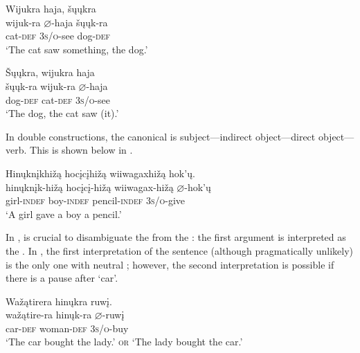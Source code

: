 \documentclass[output=paper]{LSP/langsci}
\begin{document}
\begin{exe}
\ex\label{ex:rosen:4}
\begin{xlist}

\ex \glll Wijukra  haja, šųųkra \\
 wijuk-ra {$\varnothing$}-haja  šųųk-ra\\
cat-\textsc{def}  \textsc{3s/o}-see dog-\textsc{def}\\
\glt `The cat saw something, the dog.' 

\ex \glll \v{S}ųųkra, wijukra haja  \\
 šųųk-ra wijuk-ra {$\varnothing$}-haja  \\
dog-\textsc{def} cat-\textsc{def}  \textsc{3s/o}-see \\
\glt `The dog, the cat saw (it).' 

\end{xlist}
\end{exe}

In double  constructions, the canonical  is subject---indirect object---direct object---verb. This is shown below in .

\begin{exe}

\ex \label{ex:rosen:5}\glll Hinųknįkhižą hocįcįhižą wiiwagaxhižą hok'ų.\\
hinųknįk-hižą hocįcį-hižą wiiwagax-hižą {$\varnothing$}-hok'ų\\
girl-\textsc{indef} boy-\textsc{indef} pencil-\textsc{indef} \textsc{3s/o}-give\\
\glt `A girl gave a boy a pencil.'

\end{exe}

In ,  is crucial to disambiguate the  from the : the first argument is interpreted as the . In , the first interpretation of the sentence (although pragmatically unlikely) is the only one with neutral ; however, the second interpretation is  possible if there is a pause after `car'.

\begin{exe}
\ex\label{ex:rosen:6}
 \glll Wažątirera hinųkra ruwį.\\
wažątire-ra hinųk-ra {$\varnothing$}-ruwį\\
car-\textsc{def} woman-\textsc{def} \textsc{3s/o}-buy\\
\glt `The car bought the lady.' \textsc{or} `The lady bought the car.'

\end{exe}
\end{document}
